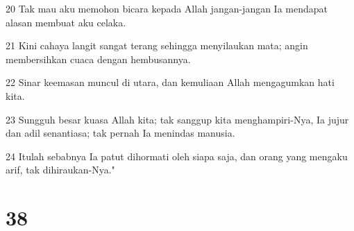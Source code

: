 \par 20 Tak mau aku memohon bicara kepada Allah jangan-jangan Ia mendapat alasan membuat aku celaka.
\par 21 Kini cahaya langit sangat terang sehingga menyilaukan mata; angin membersihkan cuaca dengan hembusannya.
\par 22 Sinar keemasan muncul di utara, dan kemuliaan Allah mengagumkan hati kita.
\par 23 Sungguh besar kuasa Allah kita; tak sanggup kita menghampiri-Nya, Ia jujur dan adil senantiasa; tak pernah Ia menindas manusia.
\par 24 Itulah sebabnya Ia patut dihormati oleh siapa saja, dan orang yang mengaku arif, tak dihiraukan-Nya."

\chapter{38}

